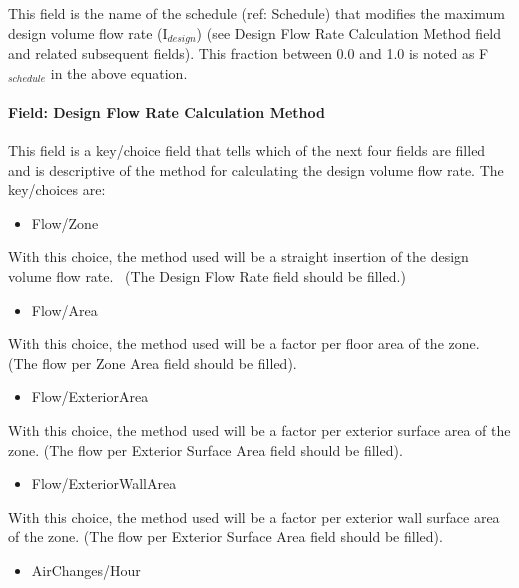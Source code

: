 This field is the name of the schedule (ref: Schedule) that modifies the maximum design volume flow rate (I\(_{design}\)) (see Design Flow Rate Calculation Method field and related subsequent fields). This fraction between 0.0 and 1.0 is noted as F\(_{schedule}\) in the above equation.

\paragraph{Field: Design Flow Rate Calculation Method}\label{field-design-flow-rate-calculation-method}

This field is a key/choice field that tells which of the next four fields are filled and is descriptive of the method for calculating the design volume flow rate. The key/choices are:

\begin{itemize}
\tightlist
\item
  Flow/Zone
\end{itemize}

With this choice, the method used will be a straight insertion of the design volume flow rate.~ (The Design Flow Rate field should be filled.)

\begin{itemize}
\tightlist
\item
  Flow/Area
\end{itemize}

With this choice, the method used will be a factor per floor area of the zone. (The flow per Zone Area field should be filled).

\begin{itemize}
\tightlist
\item
  Flow/ExteriorArea
\end{itemize}

With this choice, the method used will be a factor per exterior surface area of the zone. (The flow per Exterior Surface Area field should be filled).

\begin{itemize}
\tightlist
\item
  Flow/ExteriorWallArea
\end{itemize}

With this choice, the method used will be a factor per exterior wall surface area of the zone. (The flow per Exterior Surface Area field should be filled).

\begin{itemize}
\tightlist
\item
  AirChanges/Hour
\end{itemize}

